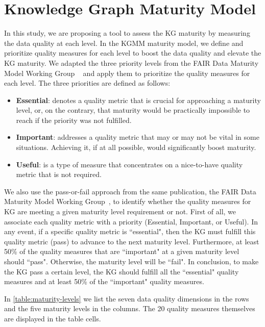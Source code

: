 \documentclass[runningheads]{llncs}
\begin{document}
\section{Knowledge Graph Maturity Model}
\label{sec:kg-maturity-model}
In this study, we are proposing a tool to assess the KG maturity by measuring the data quality at each level.
In the KGMM maturity model, we define and prioritize quality measures for each level to boost the data quality and elevate the KG maturity.
We adapted the three priority levels from the FAIR Data Maturity Model Working Group ~\cite{fair_data_maturity_model_working_group_2020_3909563} and apply them to prioritize the quality measures for each level.
The three priorities are defined as follows:
\begin{itemize}
  \item \textbf{Essential}: denotes a quality metric that is crucial for approaching a maturity level, or, on the contrary, that maturity would be practically impossible to reach if the priority was not fulfilled.
  \item \textbf{Important}: addresses a quality metric that may or may not be vital in some situations. Achieving it, if at all possible, would significantly boost maturity.
  \item \textbf{Useful}: is a type of measure that concentrates on a nice-to-have quality metric that is not required.
\end{itemize}
We also use the pass-or-fail approach from the same publication, the FAIR Data Maturity Model Working Group~\cite{fair_data_maturity_model_working_group_2020_3909563}, to identify whether the quality measures for KG are meeting a given maturity level requirement or not. First of all, we associate each quality metric with a priority (Essential, Important, or Useful).
In any event, if a specific quality metric is ``essential", then the KG must fulfill this quality metric (pass) to advance to the next maturity level.
Furthermore, at least 50\% of the quality measures that are ``important" at a given maturity level should ``pass". Otherwise, the maturity level will be ``fail".
In conclusion, to make the KG pass a certain level, the KG should fulfill all the ``essential" quality measures and at least 50\% of the ``important" quality measures.

In \autoref{table:maturity-levels} we list the seven data quality dimensions in the rows and the five maturity levels in the columns. The 20 quality measures themselves are displayed in the table cells. 
\end{document}
